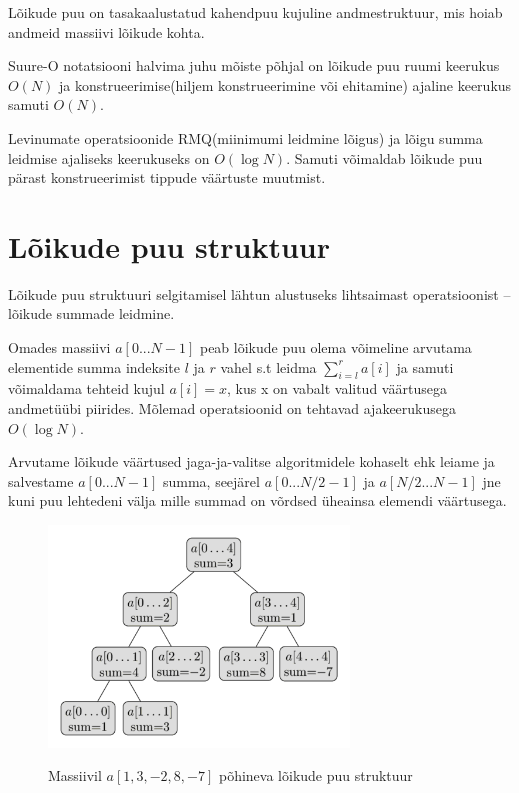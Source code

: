 \documentclass{trkut}
\theoremstyle{definition}
\begin{document}
Lõikude puu on tasakaalustatud kahendpuu kujuline andmestruktuur, mis hoiab andmeid massiivi lõikude kohta.

Suure-O notatsiooni halvima juhu mõiste põhjal on lõikude puu ruumi keerukus $O(N)$ ja konstrueerimise(hiljem konstrueerimine või ehitamine) ajaline keerukus samuti $O(N)$. \parencite{ITS}

Levinumate operatsioonide RMQ(miinimumi leidmine lõigus) ja lõigu summa leidmise ajaliseks keerukuseks on $O(\log N)$.
Samuti võimaldab lõikude puu pärast konstrueerimist tippude väärtuste muutmist. \parencite{EMaxx}

\section{Lõikude puu struktuur}
Lõikude puu struktuuri selgitamisel lähtun alustuseks lihtsaimast operatsioonist -- lõikude summade leidmine.

Omades massiivi $a[0...N-1]$ peab lõikude puu olema võimeline arvutama elementide summa indeksite $l$ ja $r$ vahel s.t leidma $\sum_{i=l}^{r} {a[i]}$ ja samuti võimaldama tehteid kujul $a[i] = x$, kus x on vabalt valitud väärtusega andmetüübi piirides. Mõlemad operatsioonid on tehtavad ajakeerukusega $O(\log N)$. \parencite{EMaxx}

Arvutame lõikude väärtused jaga-ja-valitse algoritmidele kohaselt ehk leiame ja salvestame $a[0...N-1]$ summa, seejärel $a[0...N/2-1]$ ja $a[N/2...N-1]$ jne kuni puu lehtedeni välja mille summad on võrdsed üheainsa elemendi väärtusega. \parencite{EMaxx}

\begin{figure}[H]%
    \includegraphics[width=8cm]{LPUU.png}%
    \caption{Massiivil $a[1,3,-2,8,-7]$ põhineva lõikude puu struktuur}%
    \label{CPH}%
\end{figure}
\end{document}
